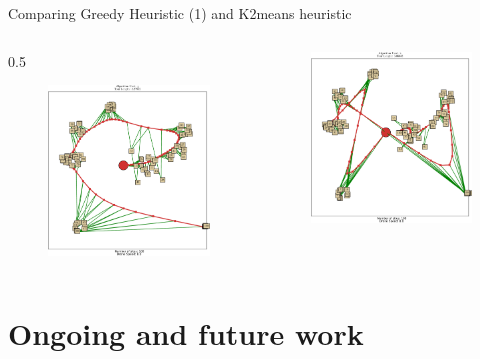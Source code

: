 \documentclass{beamer}
\begin{document}
\begin{frame}{Comparing Greedy Heuristic (1) and K2means heuristic}
 \begin{columns}
    \begin{column} {0.5\textwidth}
      \begin{figure}
        \includegraphics[width=6.0cm]{../img/greedy_example.pdf}
      \end{figure}
    \end{column}

    \begin{column}{0.5\textwidth}
       \begin{figure}
        \includegraphics[width=6.0cm]{../img/k2means_example.pdf}
      \end{figure}
     \end{column}
   \end{columns}

\end{frame}

\section{Ongoing and future work}
\end{document}
